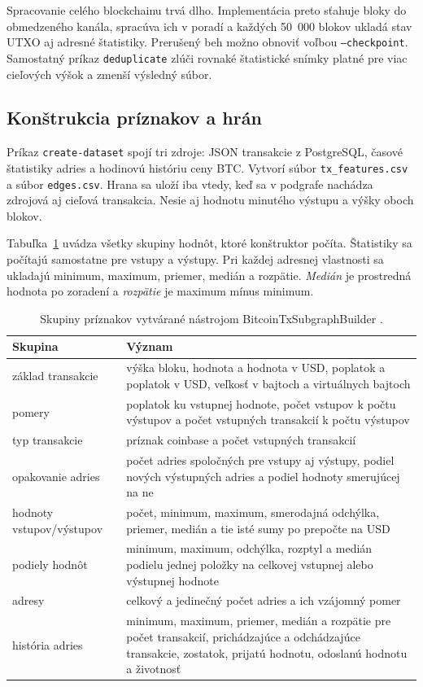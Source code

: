 Spracovanie celého blockchainu trvá dlho. Implementácia preto sťahuje
bloky do obmedzeného kanála, spracúva ich v poradí a každých 50~000
blokov ukladá stav UTXO aj adresné štatistiky. Prerušený beh možno
obnoviť voľbou \texttt{--checkpoint}. Samostatný príkaz
\texttt{deduplicate} zlúči rovnaké štatistické snímky platné pre viac
cieľových výšok a zmenší výsledný súbor.

\subsection{Konštrukcia príznakov a hrán}

Príkaz \texttt{create-dataset} spojí tri zdroje: JSON transakcie z
PostgreSQL, časové štatistiky adries a hodinovú históriu ceny BTC.
Vytvorí súbor \texttt{tx\_features.csv} a súbor \texttt{edges.csv}.
Hrana sa uloží iba vtedy, keď sa v podgrafe nachádza zdrojová aj cieľová
transakcia. Nesie aj hodnotu minutého výstupu a výšky oboch blokov.

Tabuľka~\ref{tab:open-elliptic-features} uvádza všetky skupiny hodnôt,
ktoré konštruktor počíta. Štatistiky sa počítajú samostatne pre vstupy
a výstupy. Pri každej adresnej vlastnosti sa ukladajú minimum, maximum,
priemer, medián a rozpätie. \emph{Medián} je prostredná hodnota po
zoradení a \emph{rozpätie} je maximum mínus minimum.

\begin{table}[p]
  \centering
  \small
  \caption{Skupiny príznakov vytvárané nástrojom
  BitcoinTxSubgraphBuilder \cite{bitcoinSubgraphBuilder}.}
  \label{tab:open-elliptic-features}
  \begin{tabularx}{\textwidth}{lX}
    \toprule
    Skupina & Význam \\
    \midrule
    základ transakcie & výška bloku, hodnota a hodnota v USD, poplatok
      a poplatok v USD, veľkosť v bajtoch a virtuálnych bajtoch \\
    pomery & poplatok ku vstupnej hodnote, počet vstupov k počtu
      výstupov a počet vstupných transakcií k počtu výstupov \\
    typ transakcie & príznak coinbase a počet vstupných transakcií \\
    opakovanie adries & počet adries spoločných pre vstupy aj výstupy,
      podiel nových výstupných adries a podiel hodnoty smerujúcej na ne \\
    hodnoty vstupov/výstupov & počet, minimum, maximum, smerodajná
      odchýlka, priemer, medián a tie isté sumy po prepočte na USD \\
    podiely hodnôt & minimum, maximum, odchýlka, rozptyl a medián podielu
      jednej položky na celkovej vstupnej alebo výstupnej hodnote \\
    adresy & celkový a jedinečný počet adries a ich vzájomný pomer \\
    história adries & minimum, maximum, priemer, medián a rozpätie pre
      počet transakcií, prichádzajúce a odchádzajúce transakcie,
      zostatok, prijatú hodnotu, odoslanú hodnotu a životnosť \\
    \bottomrule
  \end{tabularx}
\end{table}

